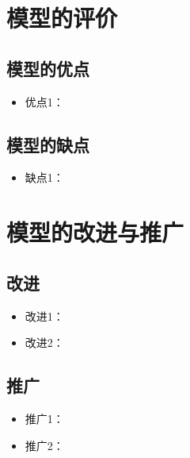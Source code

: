 \documentclass[withoutpreface,bwprint]{cumcmthesis}
\begin{document}





\section{模型的评价}

\subsection{模型的优点}
\begin{itemize}[itemindent=2em]
\item 优点1：
\end{itemize}

\subsection{模型的缺点}
\begin{itemize}[itemindent=2em]
\item 缺点1：
\end{itemize}

\section{模型的改进与推广}

\subsection{改进}
\begin{itemize}[itemindent=2em]
   \item 改进1：
   \item 改进2：
\end{itemize}


\subsection{推广}
\begin{itemize}[itemindent=2em]
    \item 推广1：
   \item 推广2：
\end{itemize}
\newpage
\nocite{*}
\end{document}
